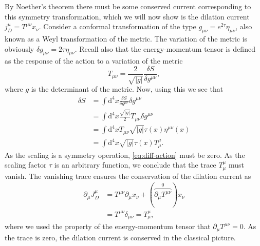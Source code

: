 By Noether's theorem there must be some conserved current corresponding to this symmetry transformation, which we will now show is the dilation current $j_D^{\mu } = T^{\mu \nu } x_{\nu }$.
Consider a conformal transformation of the type $g_{\mu \nu } = e^{2\tau } \eta _{\mu \nu }$, also known as a Weyl transformation of the metric.
The variation of the metric is obviously $\delta g_{\mu \nu } = 2 \tau \eta _{\mu \nu }$.
Recall also that the energy-momentum tensor is defined as the response of the action to a variation of the metric
\begin{equation}
  T_{\mu \nu } = \frac{2}{\sqrt{|g|}} \frac{{\delta S}}{\delta  g^{\mu \nu }},
\end{equation}
where $g$ is the determinant of the metric.
Now, using this we see that
\begin{equation}
  \label{eq:diff-action}
  \begin{split}
    \delta  S &= \int \mathrm{d}^4x \frac{\delta S}{\delta g^{\mu \nu }} \delta g^{\mu \nu }\\
    &= \int \mathrm{d}^4x \frac{\sqrt{|g|}}{2 } T_{\mu \nu } \delta g^{\mu \nu }\\
    &= \int \mathrm{d}^4x T_{\mu \nu } \sqrt{|g|} \tau (x) \eta ^{\mu \nu }(x)\\
    &= \int \mathrm{d}^4x \sqrt{|g|} \tau (x) T^{\mu }_{\mu }.
  \end{split}
\end{equation}
As the scaling is a symmetry operation, \cref{eq:diff-action} must be zero.
As the scaling factor $\tau $ is an arbitrary function, we conclude that the trace $T^{\mu }_{\mu }$ must vanish.
The vanishing trace ensures the conservation of the dilation current as
\begin{align}
  \label{eq:dilation-diff}
  \partial _{\mu } J_D^{\mu } &= T^{\mu \nu }\partial_{\mu } x_\nu +
                                (\overbrace{ \partial _{\mu }T^{\mu \nu } }^{0}) x_{\nu }\\
  \nonumber &= T^{\mu \nu }\delta _{\mu \nu } = T^{\mu }_{\mu },
\end{align}
where we used the property of the energy-momentum tensor that $\partial _{\mu }T^{\mu \nu } = 0$.
As the trace is zero, the dilation current is conserved in the classical picture.

